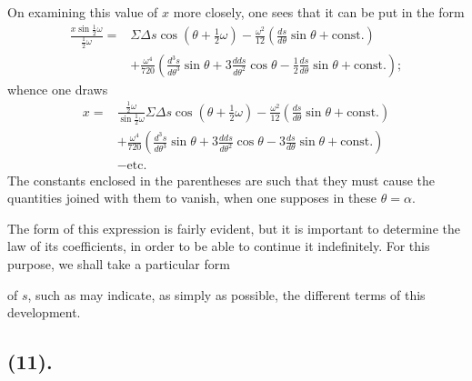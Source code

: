 \documentclass{article}
\begin{document}
On examining this value of $x$ more closely, one sees that it can be put in the form
\[ \begin{aligned} \frac{x\sin\frac{1}{2}\omega}{\frac{1}{2}\omega}={}&\Sigma\Delta s\cos(\theta+\tfrac{1}{2}\omega)-\frac{\omega^{2}}{12}\left(\frac{ds}{d\theta}\sin\theta+\text{const.}\right)\\ &+\frac{\omega^{4}}{720}\left(\frac{d^{3}s}{d\theta^{3}}\sin\theta+3\frac{dds}{d\theta^{2}}\cos\theta-\frac{1}{2}\frac{ds}{d\theta}\sin\theta+\text{const.}\right); \end{aligned} \]
whence one draws
\[ \begin{aligned} x={}&\frac{\frac{1}{2}\omega}{\sin\frac{1}{2}\omega}\Sigma\Delta s\cos(\theta+\tfrac{1}{2}\omega)-\frac{\omega^{2}}{12}\left(\frac{ds}{d\theta}\sin\theta+\text{const.}\right)\\ &+\frac{\omega^{4}}{720}\left(\frac{d^{3}s}{d\theta^{3}}\sin\theta+3\frac{dds}{d\theta^{2}}\cos\theta-3\frac{ds}{d\theta}\sin\theta+\text{const.}\right)\\ &-\text{etc.} \end{aligned} \]
The constants enclosed in the parentheses are such that they must cause the quantities joined with them to vanish, when one supposes in these $\theta=\alpha$.

The form of this expression is fairly evident, but it is important to determine the law of its coefficients, in order to be able to continue it indefinitely. For this purpose, we shall take a particular form

of $s$, such as may indicate, as simply as possible, the different terms of this development.

\subsection*{(11).}
\end{document}
